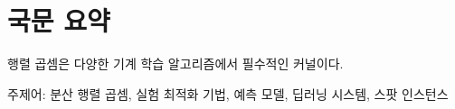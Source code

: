 \section*{국문 요약} 						%



행렬 곱셈은 다양한 기계 학습 알고리즘에서 필수적인 커널이다. 

\begin{keywords}
주제어: 분산 행렬 곱셈, 실험 최적화 기법, 예측 모델, 딥러닝 시스템, 스팟 인스턴스
\end{keywords}
\clearpage

